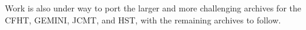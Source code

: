 Work is also under way to port the larger and more challenging archives for the CFHT, GEMINI, JCMT, and HST, with the remaining archives to follow.


